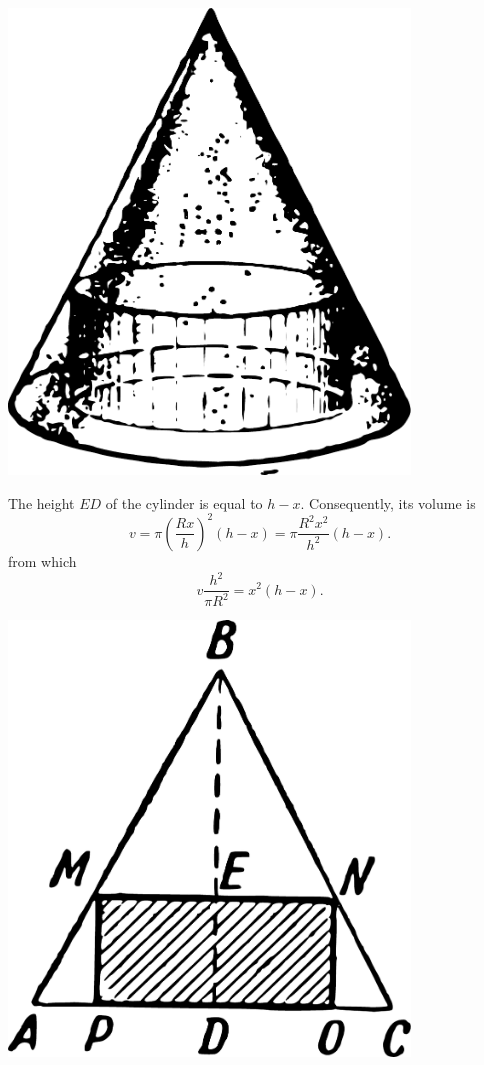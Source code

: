 \begin{marginfigure}[-2cm]%
\centering
\includegraphics[width=0.8\textwidth]{figures/ch-12/fig-187.pdf}
\end{marginfigure}
The height $ED$ of the cylinder is equal to \( h - x \). Consequently, its volume is
\begin{equation*}%
 v = \pi \left(\frac{Rx}{h}\right)^{2} (h - x) = \pi \frac{R^{2} x^{2}}{h^{2}} (h - x). 
\end{equation*}
from which
\begin{equation*}%
v \frac{h^{2}}{\pi R^{2}} = x^{2} (h - x).
\end{equation*}
\begin{marginfigure}[0cm]%
\centering
\includegraphics[width=0.8\textwidth]{figures/ch-12/fig-188.pdf}
\end{marginfigure}
